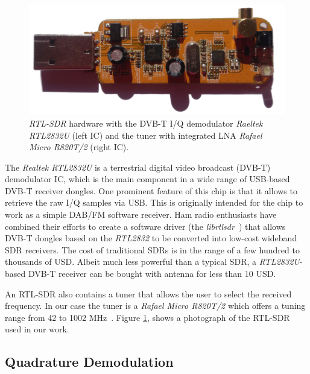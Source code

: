 \documentclass[conference]{IEEEtran}
\begin{document}
\begin{figure}[h]
				\centering
				\includegraphics[width=0.5\columnwidth]{./fig/rtlsdr.jpg}
				\caption{\textit{RTL-SDR} hardware with the DVB-T I/Q
				demodulator \textit{Raeltek RTL2832U} (left IC) and the tuner
				with integrated LNA \textit{Rafael Micro R820T/2} (right IC).} 
				\label{fig:rtl_hw}
\end{figure}
The \textit{Realtek RTL2832U} is a terrestrial digital video broadcast
(DVB-T) demodulator IC, which is the main component in a wide range of
USB-based DVB-T receiver dongles. One prominent feature of this chip is
that it allows to retrieve the raw I/Q samples via USB. This is
originally intended for the chip to work as a simple DAB/FM software
receiver. Ham radio enthusiasts have combined their efforts to create a
software driver (the \textit{librtlsdr}~\cite{steve-m_librtlsdr})
that allows DVB-T dongles based on the \textit{RTL2832} to be converted
into low-cost wideband SDR receivers. The cost of traditional SDRs is
in the range of a few hundred to thousands of USD. Albeit much less
powerful than a typical SDR, a \textit{RTL2832U}-based DVB-T receiver
can be bought with antenna for less than 10 USD.  

An RTL-SDR also contains a tuner that allows the user to select the
received frequency.  In our case the tuner is a \textit{Rafael Micro
R820T/2} which offers a tuning range from 42 to 1002
MHz~\cite{rafael_r820t_2011}. Figure \ref{fig:rtl_hw}, shows a
photograph of the RTL-SDR used in our work. 

\subsection{Quadrature Demodulation}
\end{document}
